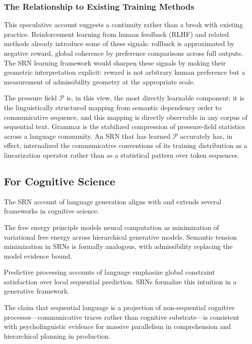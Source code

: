 \documentclass[11pt, a4paper]{article}
\theoremstyle{srn}
\theoremstyle{srnremark}
\begin{document}
\subsubsection*{The Relationship to Existing Training Methods}

This speculative account suggests a continuity rather than a break
with existing practice.
Reinforcement learning from human feedback (RLHF) and related methods
already introduce some of these signals: rollback is approximated by
negative reward, global coherence by preference comparisons across
full outputs.
The SRN learning framework would sharpen these signals by making their
geometric interpretation explicit: reward is not arbitrary human
preference but a measurement of admissibility geometry at the
appropriate scale.

The pressure field $\mathcal{P}$ is, in this view, the most directly
learnable component: it is the linguistically structured mapping from
semantic dependency order to communicative sequence, and this mapping
is directly observable in any corpus of sequential text.
Grammar is the stabilized compression of pressure-field statistics
across a language community.
An SRN that has learned $\mathcal{P}$ accurately has, in effect,
internalized the communicative conventions of its training distribution
as a linearization operator rather than as a statistical pattern over
token sequences.

\subsection{For Cognitive Science}

The SRN account of language generation aligns with and extends several
frameworks in cognitive science.

The free energy principle \citep{friston2010free} models neural
computation as minimization of variational free energy across
hierarchical generative models.
Semantic tension minimization in SRNs is formally analogous, with
admissibility replacing the model evidence bound.

Predictive processing accounts of language
\citep{pearl1988probabilistic} emphasize global constraint satisfaction
over local sequential prediction.
SRNs formalize this intuition in a generative framework.

The claim that sequential language is a projection of non-sequential
cognitive processes---communicative traces rather than cognitive
substrate---is consistent with psycholinguistic evidence for massive
parallelism in comprehension and hierarchical planning in production.
\end{document}
